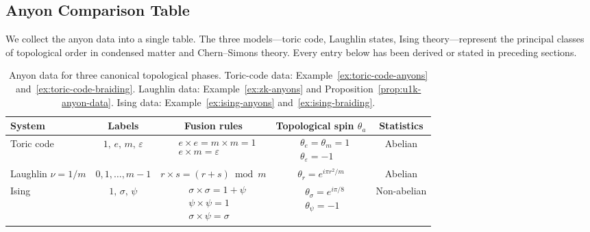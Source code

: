 \subsection{Anyon Comparison Table}
\label{subsec:anyon-comparison-table}

We collect the anyon data into a single table.  The three models---toric code,
Laughlin states, Ising theory---represent the principal classes of topological
order in condensed matter and Chern--Simons theory.  Every entry below has been
derived or stated in preceding sections.

\begin{table}[ht]
\centering
\renewcommand{\arraystretch}{1.6}
\begin{tabular}{@{} l c c c c @{}}
\hline\hline
\textbf{System} & \textbf{Labels} & \textbf{Fusion rules} &
\textbf{Topological spin $\theta_a$} & \textbf{Statistics} \\
\hline
Toric code &
$1,\, e,\, m,\, \varepsilon$ &
$\begin{aligned}
    &e \times e = m \times m = 1 \\
    &e \times m = \varepsilon
\end{aligned}$ &
$\begin{aligned}
    &\theta_e = \theta_m = 1 \\
    &\theta_\varepsilon = -1
\end{aligned}$ &
Abelian \\[6pt]
\hline
Laughlin $\nu = 1/m$ &
$0, 1, \ldots, m{-}1$ &
$r \times s = (r+s) \bmod m$ &
$\theta_r = e^{i\pi r^2/m}$ &
Abelian \\[6pt]
\hline
Ising &
$1,\, \sigma,\, \psi$ &
$\begin{aligned}
    &\sigma \times \sigma = 1 + \psi \\
    &\psi \times \psi = 1 \\
    &\sigma \times \psi = \sigma
\end{aligned}$ &
$\begin{aligned}
    &\theta_\sigma = e^{i\pi/8} \\
    &\theta_\psi = -1
\end{aligned}$ &
Non-abelian \\[6pt]
\hline\hline
\end{tabular}
\caption{Anyon data for three canonical topological phases.
Toric-code data: Example~\ref{ex:toric-code-anyons}
and~\ref{ex:toric-code-braiding}.
Laughlin data: Example~\ref{ex:zk-anyons}
and Proposition~\ref{prop:u1k-anyon-data}.
Ising data: Example~\ref{ex:ising-anyons}
and~\ref{ex:ising-braiding}.}
\label{tab:anyon-comparison}
\end{table}


